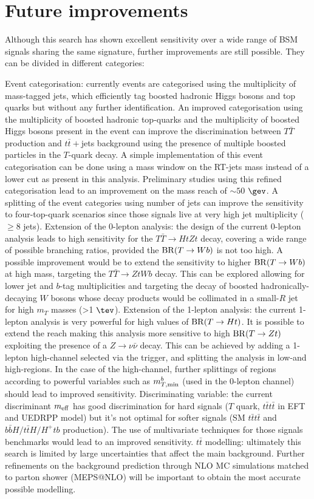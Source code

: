 \section{Future improvements}
\label{chp:VLQ:sec:improvemente}
Although this search has shown excellent sensitivity over a wide range of BSM signals sharing the same signature, further improvements are still possible. They can be divided in different categories:

\bi
\ib Event categorisation: currently events are categorised using the multiplicity of mass-tagged jets, which efficiently tag boosted hadronic Higgs bosons and top quarks but without any further identification. An improved categorisation using the multiplicity of boosted hadronic top-quarks and the multiplicity of boosted Higgs bosons present in the event can improve the discrimination between $T\bar{T}$ production and $t\bar{t}+$jets background using the presence of multiple boosted particles in the $T$-quark decay. A simple implementation of this event categorisation can be done using a mass window on the RT-jets mass instead of a lower cut as present in this analysis. Preliminary studies using this refined categorisation lead to an improvement on the mass reach of $\sim50$ $\gev$. A splitting of the event categories using number of jets can improve the sensitivity to four-top-quark scenarios since those signals live at very high jet multiplicity ($\ge8$ jets). 
\ib Extension of the 0-lepton analysis: the design of the current 0-lepton analysis leads to high sensitivity for the $T\bar{T} \to HtZt$ decay, covering a wide range of possible branching ratios, provided the ${\rm BR}(T\to Wb)$ is not too high. A possible improvement would be to extend the sensitivity to higher ${\rm BR}(T\to Wb)$ at high mass, targeting the $T\bar{T} \to ZtWb$ decay.
This can be explored allowing for lower jet and $b$-tag multiplicities and targeting the decay of boosted hadronically-decaying $W$ bosons whose decay products would be collimated in a small-$R$ jet for high $m_{T}$ masses (>1 $\tev$).  
\ib Extension of the 1-lepton analysis: the current 1-lepton analysis is very powerful for high values of ${\rm BR}(T\to Ht)$. It is possible to extend the reach making this analysis more sensitive to high ${\rm BR}(T\to Zt)$ exploiting the presence of a $Z \to \nu \bar{\nu}$ decay. This can be achieved by adding a 1-lepton high-\MET channel selected via the \MET trigger, and splitting the analysis in low-\MET and high-\MET regions. In the case of the high-\MET channel, further splittings of regions according to powerful variables such as $m_{T,{\rm min}}^{b}$ (used in the 0-lepton channel) should lead to improved sensitivity.
\ib Discriminating variable: the current discriminant $m_{\rm eff}$ has good discrimination for hard signals ($T$ quark, $t\bar{t}t\bar{t}$ in EFT and UEDRPP model) but it's not optimal for softer signals (SM $t\bar{t}t\bar{t}$ and $b\bar{b}H/t\bar{t}H/H^{+}tb$ production). The use of multivariate techniques for those signals benchmarks would lead to an improved sensitivity.
\ib $t\bar{t}$ modelling: ultimately this search is limited by large uncertainties that affect the main background. Further refinements on the background prediction through NLO MC simulations matched to parton shower (MEPS@NLO) will be important to obtain the most accurate possible modelling.
\ei
